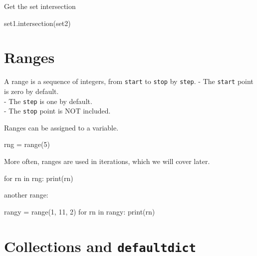 \documentclass[
  letterpaper,
  DIV=11,
  numbers=noendperiod]{scrreprt}
\newenvironment{Shaded}{\begin{snugshade}}{\end{snugshade}}
\newcommand{\BuiltInTok}[1]{\textcolor[rgb]{0.00,0.23,0.31}{#1}}
\newcommand{\ControlFlowTok}[1]{\textcolor[rgb]{0.00,0.23,0.31}{#1}}
\newcommand{\DecValTok}[1]{\textcolor[rgb]{0.68,0.00,0.00}{#1}}
\newcommand{\KeywordTok}[1]{\textcolor[rgb]{0.00,0.23,0.31}{#1}}
\newcommand{\NormalTok}[1]{\textcolor[rgb]{0.00,0.23,0.31}{#1}}
\newcommand{\OperatorTok}[1]{\textcolor[rgb]{0.37,0.37,0.37}{#1}}
\begin{document}
Get the set intersection

\begin{Shaded}
\begin{Highlighting}[]
\NormalTok{set1.intersection(set2)}
\end{Highlighting}
\end{Shaded}

\hypertarget{ranges}{%
\chapter{Ranges}\label{ranges}}

A range is a sequence of integers, from \texttt{start} to \texttt{stop}
by \texttt{step}. - The \texttt{start} point is zero by default.\\
- The \texttt{step} is one by default.\\
- The \texttt{stop} point is NOT included.

Ranges can be assigned to a variable.

\begin{Shaded}
\begin{Highlighting}[]
\NormalTok{rng }\OperatorTok{=} \BuiltInTok{range}\NormalTok{(}\DecValTok{5}\NormalTok{)}
\end{Highlighting}
\end{Shaded}

More often, ranges are used in iterations, which we will cover later.

\begin{Shaded}
\begin{Highlighting}[]
\ControlFlowTok{for}\NormalTok{ rn }\KeywordTok{in}\NormalTok{ rng:}
    \BuiltInTok{print}\NormalTok{(rn)}
\end{Highlighting}
\end{Shaded}

another range:

\begin{Shaded}
\begin{Highlighting}[]
\NormalTok{rangy }\OperatorTok{=} \BuiltInTok{range}\NormalTok{(}\DecValTok{1}\NormalTok{, }\DecValTok{11}\NormalTok{, }\DecValTok{2}\NormalTok{)}
\ControlFlowTok{for}\NormalTok{ rn }\KeywordTok{in}\NormalTok{ rangy:}
    \BuiltInTok{print}\NormalTok{(rn)}
\end{Highlighting}
\end{Shaded}

\hypertarget{collections-and-defaultdict}{%
\chapter{\texorpdfstring{Collections and
\texttt{defaultdict}}{Collections and defaultdict}}\label{collections-and-defaultdict}}
\end{document}
